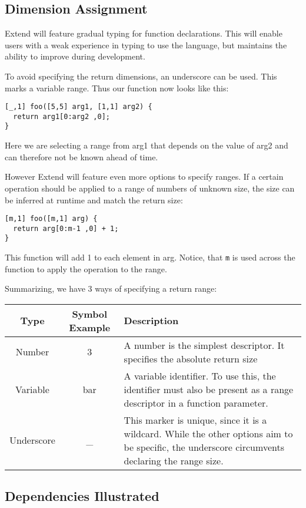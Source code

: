 \subsection{Dimension Assignment}
\par Extend will feature gradual typing for function declarations. This will enable users with a weak experience in typing to use the language, but maintains the ability to improve during development.
\par To avoid specifying the return dimensions, an underscore can be used. This marks a variable range. Thus our function now looks like this:
\begin{lstlisting}
[_,1] foo([5,5] arg1, [1,1] arg2) {
  return arg1[0:arg2 ,0];
}
\end{lstlisting}
Here we are selecting a range from arg1 that depends on the value of arg2 and can therefore not be known ahead of time.
\par However Extend will feature even more options to specify ranges. If a certain operation should be applied to a range of numbers of unknown size, the size can be inferred at runtime and match the return size:
\begin{lstlisting}
[m,1] foo([m,1] arg) {
  return arg[0:m-1 ,0] + 1;
}
\end{lstlisting}
This function will add 1 to each element in arg. Notice, that \texttt{m} is used across the function to apply the operation to the range.
\par Summarizing, we have 3 ways of specifying a return range:\newline
\begin{tabularx}{\columnwidth}{| c | c | X |} \hline
Type & Symbol Example & Description \\ \hline
Number & 3 & A number is the simplest descriptor. It specifies the absolute return size \\ \hline
Variable & bar & A variable identifier. To use this, the identifier must also be present as a range descriptor in a function parameter. \\ \hline
Underscore & \_ & This marker is unique, since it is a wildcard. While the other options aim to be specific, the underscore circumvents declaring the range size. \\ \hline
\end{tabularx}
\subsection{Dependencies Illustrated}
